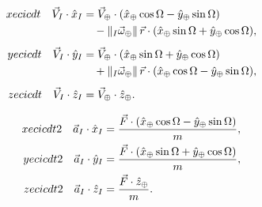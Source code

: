 \begin{equation}
\begin{aligned}
  xecicdt\quad
  \vec{V}_{I}\cdot\hat{x}_{I}
    &= \vec{V}_{\oplus}\cdot
       (\hat{x}_{\oplus}\cos\Omega-\hat{y}_{\oplus}\sin\Omega) \\
    &\quad - \left\lVert{}_{I}\vec{\omega}_{\oplus}\right\rVert
       \vec{r}\cdot
       (\hat{x}_{\oplus}\sin\Omega+\hat{y}_{\oplus}\cos\Omega),\\[0.4em]
  yecicdt\quad
  \vec{V}_{I}\cdot\hat{y}_{I}
    &= \vec{V}_{\oplus}\cdot
       (\hat{x}_{\oplus}\sin\Omega+\hat{y}_{\oplus}\cos\Omega) \\
    &\quad + \left\lVert{}_{I}\vec{\omega}_{\oplus}\right\rVert
       \vec{r}\cdot
       (\hat{x}_{\oplus}\cos\Omega-\hat{y}_{\oplus}\sin\Omega),\\[0.4em]
  zecicdt\quad
  \vec{V}_{I}\cdot\hat{z}_{I}
    &= \vec{V}_{\oplus}\cdot\hat{z}_{\oplus}.
\end{aligned}
\label{eq:ecic-velocity-components}
\end{equation}

\begin{equation}
\begin{aligned}
  xecicdt2\quad
  \vec{a}_{I}\cdot\hat{x}_{I}
    &= \frac{\vec{F}\cdot
       (\hat{x}_{\oplus}\cos\Omega-\hat{y}_{\oplus}\sin\Omega)}{m},\\
  yecicdt2\quad
  \vec{a}_{I}\cdot\hat{y}_{I}
    &= \frac{\vec{F}\cdot
       (\hat{x}_{\oplus}\sin\Omega+\hat{y}_{\oplus}\cos\Omega)}{m},\\
  zecicdt2\quad
  \vec{a}_{I}\cdot\hat{z}_{I}
    &= \frac{\vec{F}\cdot\hat{z}_{\oplus}}{m}.
\end{aligned}
\label{eq:ecic-acceleration-components}
\end{equation}
